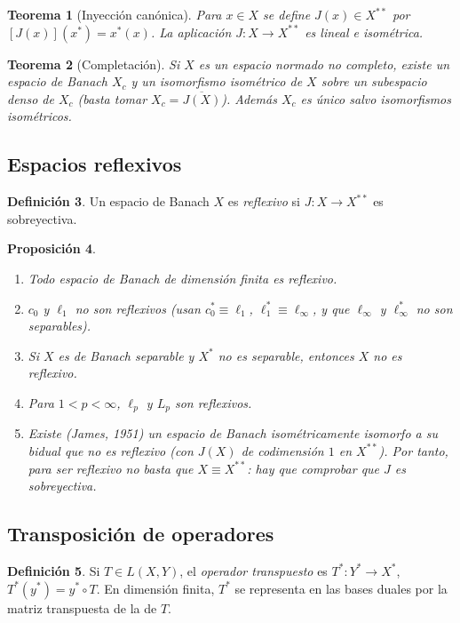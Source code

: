 \documentclass[11pt,a4paper]{article}
\theoremstyle{plain}
\newtheorem{teorema}{Teorema}[section]
\newtheorem{proposicion}[teorema]{Proposición}
\theoremstyle{definition}
\newtheorem{definicion}[teorema]{Definición}
\theoremstyle{remark}
\begin{document}
\begin{teorema}[Inyección canónica]
Para $x\in X$ se define $J(x)\in X^{**}$ por $[J(x)](x^*)=x^*(x)$. La aplicación $J:X\to X^{**}$ es lineal e isométrica.
\end{teorema}

\begin{teorema}[Completación]
Si $X$ es un espacio normado no completo, existe un espacio de Banach $X_c$ y un isomorfismo isométrico de $X$ sobre un subespacio denso de $X_c$ (basta tomar $X_c=\overline{J(X)}$). Además $X_c$ es único salvo isomorfismos isométricos.
\end{teorema}

\subsection{Espacios reflexivos}

\begin{definicion}
Un espacio de Banach $X$ es \emph{reflexivo} si $J:X\to X^{**}$ es sobreyectiva.
\end{definicion}

\begin{proposicion}
\begin{enumerate}[label=(\alph*)]
\item Todo espacio de Banach de dimensión finita es reflexivo.
\item $c_0$ y $\ell_1$ no son reflexivos (usan $c_0^*\equiv\ell_1$, $\ell_1^*\equiv\ell_\infty$, y que $\ell_\infty$ y $\ell_\infty^*$ no son separables).
\item Si $X$ es de Banach separable y $X^*$ no es separable, entonces $X$ no es reflexivo.
\item Para $1<p<\infty$, $\ell_p$ y $L_p$ son reflexivos.
\item Existe (James, 1951) un espacio de Banach isométricamente isomorfo a su bidual que no es reflexivo (con $J(X)$ de codimensión $1$ en $X^{**}$). Por tanto, para ser reflexivo no basta que $X\equiv X^{**}$: hay que comprobar que $J$ es sobreyectiva.
\end{enumerate}
\end{proposicion}

\subsection{Transposición de operadores}

\begin{definicion}
Si $T\in L(X,Y)$, el \emph{operador transpuesto} es $T^*:Y^*\to X^*$, $T^*(y^*)=y^*\circ T$. En dimensión finita, $T^*$ se representa en las bases duales por la matriz transpuesta de la de $T$.
\end{definicion}
\end{document}
